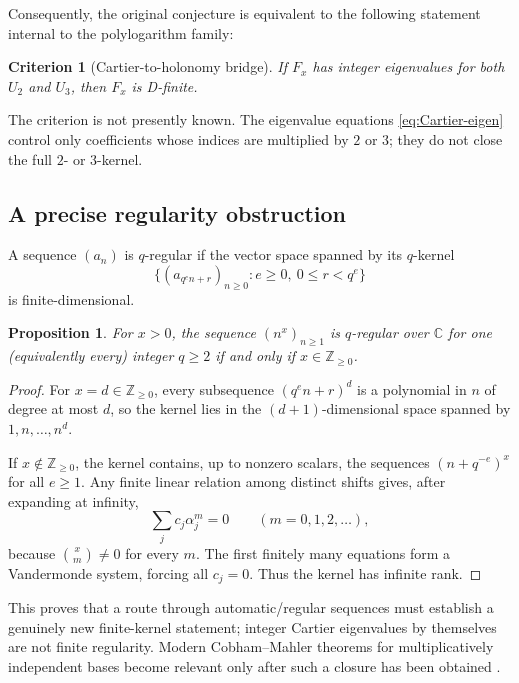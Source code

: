 \documentclass[11pt]{article}
\numberwithin{equation}{section}
\newtheorem{proposition}[theorem]{Proposition}
\newtheorem{criterion}[theorem]{Criterion}
\theoremstyle{definition}
\theoremstyle{remark}
\newcommand{\Z}{\mathbb{Z}}
\newcommand{\C}{\mathbb{C}}
\begin{document}
Consequently, the original conjecture is equivalent to the following statement internal to the polylogarithm family:

\begin{criterion}[Cartier-to-holonomy bridge]
\label{crit:cartier-holonomy}
If $F_x$ has integer eigenvalues for both $U_2$ and $U_3$, then $F_x$ is D-finite.
\end{criterion}

The criterion is not presently known.  The eigenvalue equations \eqref{eq:Cartier-eigen} control only coefficients whose indices are multiplied by $2$ or $3$; they do not close the full $2$- or $3$-kernel.

\subsection{A precise regularity obstruction}
A sequence $(a_n)$ is $q$-regular if the vector space spanned by its $q$-kernel
\[
 \{(a_{q^en+r})_{n\ge0}:e\ge0,\ 0\le r<q^e\}
\]
is finite-dimensional.

\begin{proposition}
\label{prop:qregular}
For $x>0$, the sequence $(n^x)_{n\ge1}$ is $q$-regular over $\C$ for one (equivalently every) integer $q\ge2$ if and only if $x\in\Z_{\ge0}$.
\end{proposition}

\begin{proof}
For $x=d\in\Z_{\ge0}$, every subsequence $(q^en+r)^d$ is a polynomial in $n$ of degree at most $d$, so the kernel lies in the $(d+1)$-dimensional space spanned by $1,n,\ldots,n^d$.

If $x\notin\Z_{\ge0}$, the kernel contains, up to nonzero scalars, the sequences $(n+q^{-e})^x$ for all $e\ge1$.  Any finite linear relation among distinct shifts gives, after expanding at infinity,
\[
 \sum_j c_j\alpha_j^m=0\qquad(m=0,1,2,\ldots),
\]
because $\binom{x}{m}\ne0$ for every $m$.  The first finitely many equations form a Vandermonde system, forcing all $c_j=0$.  Thus the kernel has infinite rank.
\end{proof}

This proves that a route through automatic/regular sequences must establish a genuinely new finite-kernel statement; integer Cartier eigenvalues by themselves are not finite regularity.  Modern Cobham--Mahler theorems for multiplicatively independent bases become relevant only after such a closure has been obtained \cite{AdamczewskiBell,AdamczewskiFaverjonI,AdamczewskiFaverjonII}.
\end{document}
